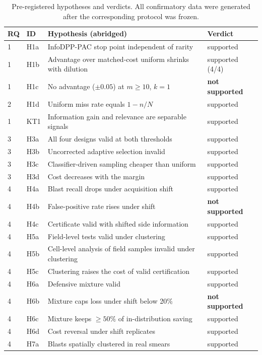 \documentclass[11pt]{article}
\theoremstyle{remark}
\theoremstyle{definition}
\begin{document}
\begin{table}[t]
\centering\small
\caption{Pre-registered hypotheses and verdicts. All confirmatory data were generated after the corresponding protocol was frozen.}\label{tab:hyp}
\begin{tabular}{@{}llp{8.2cm}l@{}}
\toprule
RQ & ID & Hypothesis (abridged) & Verdict\\
\midrule
1 & H1a & InfoDPP-PAC stop point independent of rarity & supported\\
1 & H1b & Advantage over matched-cost uniform shrinks with dilution & supported (4/4)\\
1 & H1c & No advantage ($\pm0.05$) at $m\ge10$, $k=1$ & \textbf{not supported}\\
2 & H1d & Uniform miss rate equals $1-n/N$ & supported\\
1 & KT1 & Information gain and relevance are separable signals & supported\\
3 & H3a & All four designs valid at both thresholds & supported\\
3 & H3b & Uncorrected adaptive selection invalid & supported\\
3 & H3c & Classifier-driven sampling cheaper than uniform & supported\\
3 & H3d & Cost decreases with the margin & supported\\
4 & H4a & Blast recall drops under acquisition shift & supported\\
4 & H4b & False-positive rate rises under shift & \textbf{not supported}\\
4 & H4c & Certificate valid with shifted side information & supported\\
4 & H5a & Field-level tests valid under clustering & supported\\
4 & H5b & Cell-level analysis of field samples invalid under clustering & supported\\
4 & H5c & Clustering raises the cost of valid certification & supported\\
4 & H6a & Defensive mixture valid & supported\\
4 & H6b & Mixture caps loss under shift below 20\% & \textbf{not supported}\\
4 & H6c & Mixture keeps $\ge50\%$ of in-distribution saving & supported\\
4 & H6d & Cost reversal under shift replicates & supported\\
4 & H7a & Blasts spatially clustered in real smears & supported\\
\bottomrule
\end{tabular}
\end{table}
\end{document}
